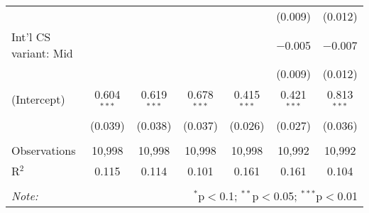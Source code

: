 \begin{tabular}{@{\extracolsep{5pt}}lcccccc}
  &  &  &  &  & (0.009) & (0.012) \\ 
  Int'l CS variant: Mid &  &  &  &  & $-$0.005 & $-$0.007 \\ 
  &  &  &  &  & (0.009) & (0.012) \\ 
  (Intercept) & 0.604$^{***}$ & 0.619$^{***}$ & 0.678$^{***}$ & 0.415$^{***}$ & 0.421$^{***}$ & 0.813$^{***}$ \\ 
  & (0.039) & (0.038) & (0.037) & (0.026) & (0.027) & (0.036) \\ 
 \hline \\[-1.8ex] 
Observations & 10,998 & 10,998 & 10,998 & 10,998 & 10,992 & 10,992 \\ 
R$^{2}$ & 0.115 & 0.114 & 0.101 & 0.161 & 0.161 & 0.104 \\ 
\hline 
\hline \\[-1.8ex] 
\textit{Note:}  & \multicolumn{6}{r}{$^{*}$p$<$0.1; $^{**}$p$<$0.05; $^{***}$p$<$0.01} \\ 
\end{tabular} 

